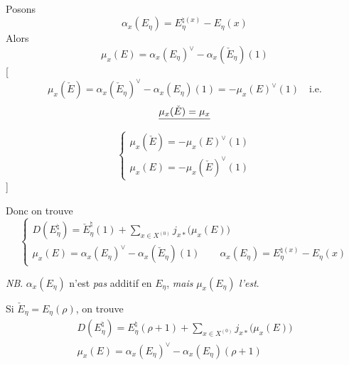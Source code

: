 \documentclass[11pt,a4paper]{article}
\begin{document}
Posons
\[
  \boxed{\alpha_x(E_\eta) = E_\eta^{\natural(x)} - E_\eta(x)}
\]
Alors
\[
  \boxed{\mu_x(E) = \alpha_x(E_\eta)^{\vee} - \alpha_x(\check E_\eta)(1)}
\]
[
\[
  \mu_x(\check E) = \alpha_x(\check E_\eta)^{\vee} - \alpha_x(E_\eta)(1)
  = -\mu_x(E)^{\vee}(1) \quad \text{i.e.}
\]
\[
  \struck{\mu_x(\check E) = \mu_x}
\]
\[
  \left\lbrace
  \begin{array}{l}
    \mu_x(\check E) = -\mu_x(E)^{\vee}(1) \\
    \mu_x(E) = -\mu_x(\check E)^{\vee}(1)
  \end{array}
  \right.
\]
]

Donc on trouve
\[
  \boxed{
  \left\lbrace
  \begin{array}{l}
    D(E_\eta^{\natural}) = \check E_\eta^{\natural}(1)
      + \displaystyle\sum_{x \in X^{(0)}} j_{x*}\bigl(\mu_x(E)\bigr) \\[10pt]
    \mu_x(E) = \alpha_x(E_\eta)^{\vee} - \alpha_x(\check E_\eta)(1) \qquad
    \alpha_x(E_\eta) = E_\eta^{\natural(x)} - E_\eta(x)
  \end{array}
  \right.}
\]

\emph{NB}. $\alpha_x(E_\eta)$ n'est \emph{pas} additif en $E_\eta$,
\emph{mais} $\mu_x(E_\eta)$ \emph{l'est}.

Si $\check E_\eta = E_\eta(\rho)$, on trouve
\[
  \boxed{
  \begin{array}{l}
    D(E_\eta^{\natural}) = E_\eta^{\natural}(\rho+1)
      + \displaystyle\sum_{x \in X^{(0)}} j_{x*}\bigl(\mu_x(E)\bigr) \\[10pt]
    \mu_x(E) = \alpha_x(E_\eta)^{\vee} - \alpha_x(E_\eta)(\rho+1)
  \end{array}}
\]
\end{document}
